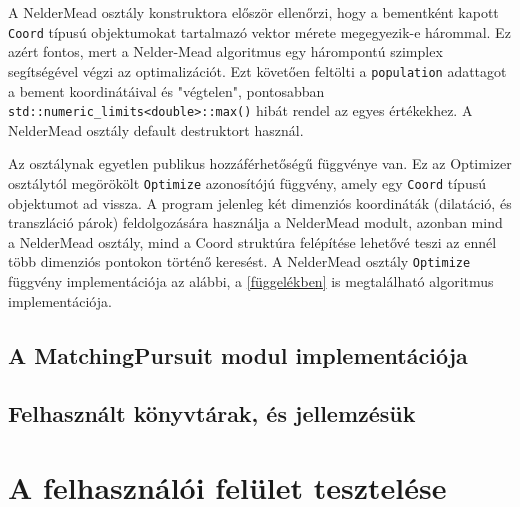 \documentclass[oneside,titlepage,12pt,a4paper]{report}
\begin{document}
\par A NelderMead osztály konstruktora először ellenőrzi, hogy a bementként kapott \texttt{Coord} típusú objektumokat tartalmazó vektor mérete megegyezik-e hárommal. Ez azért fontos, mert a Nelder-Mead algoritmus egy hárompontú szimplex segítségével végzi az optimalizációt. Ezt követően feltölti a \texttt{population} adattagot a bement koordinátáival és "végtelen", pontosabban \texttt{std::numeric\_limits<double>::max()} hibát rendel az egyes értékekhez. A NelderMead osztály default destruktort használ. 
\par Az osztálynak egyetlen publikus hozzáférhetőségű függvénye van. Ez az Optimizer osztálytól megörökölt \texttt{Optimize} azonosítójú függvény, amely egy \texttt{Coord} típusú objektumot ad vissza. A program jelenleg két dimenziós koordináták (dilatáció, és transzláció párok) feldolgozására használja a NelderMead modult, azonban mind a NelderMead osztály, mind a Coord struktúra felépítése lehetővé teszi az ennél több dimenziós pontokon történő keresést. A NelderMead osztály \texttt{Optimize} függvény implementációja az alábbi, a \ref{függelékben} is megtalálható algoritmus implementációja. 

\subsection{A MatchingPursuit modul implementációja}

\subsection{Felhasznált könyvtárak, és jellemzésük}

\section{A felhasználói felület tesztelése}
\end{document}
